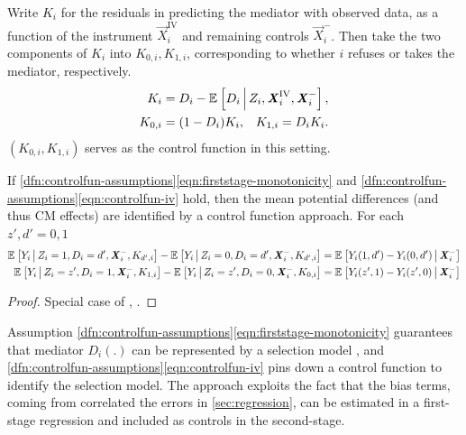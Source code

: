 Write $K_i$ for the residuals in predicting the mediator with observed data, as a function of the instrument $\vec X_i^{\text{IV}}$ and remaining controls $\vec X_i^-$.
Then take the two components of $K_i$ into $K_{0 ,i}, K_{1,i}$, corresponding to whether $i$ refuses or takes the mediator, respectively.
\begin{align*}
    K_i &= D_i - \mathbb{E}_{} \left[ D_i \, \middle\vert \, Z_i, \boldsymbol{\mathit{X}}_i^{\text{IV}}, \boldsymbol{\mathit{X}}_i^- \right], \\
    K_{0,i} &= (1 - D_i) K_i, \;\;\;
        K_{1,i} = D_i K_i.
\end{align*}
$\left( K_{0 ,i}, K_{1,i}\right)$ serves as the control function in this setting.
\begin{theorem}
    \label{thm:controlfun}
    If \ref{dfn:controlfun-assumptions}\eqref{eqn:firststage-monotonicity} and \ref{dfn:controlfun-assumptions}\eqref{eqn:controlfun-iv} hold, then the mean potential differences
    (and thus CM effects)
    are identified by a control function approach.
    For each $z', d' = 0,1$
    \begin{align*}
        \mathbb{E}_{} \left[ Y_i \, \middle\vert \, Z_i = 1, D_i = d', \boldsymbol{\mathit{X}}_i^-, K_{d',i} \right]
        - \mathbb{E}_{} \left[ Y_i \, \middle\vert \, Z_i = 0, D_i = d', \boldsymbol{\mathit{X}}_i^-, K_{d',i} \right] 
        &= \mathbb{E}_{} \left[ Y_i(1, d') - Y_i(0, d') \, \middle\vert \, \boldsymbol{\mathit{X}}_i^- \right] \\
        \mathbb{E}_{} \left[ Y_i \, \middle\vert \, Z_i = z', D_i = 1, \boldsymbol{\mathit{X}}_i^-, K_{1,i} \right]
        - \mathbb{E}_{} \left[ Y_i \, \middle\vert \, Z_i = z', D_i = 0, \boldsymbol{\mathit{X}}_i^-, K_{0,i} \right] 
        &= \mathbb{E}_{} \left[ Y_i(z', 1) - Y_i(z', 0) \, \middle\vert \, \boldsymbol{\mathit{X}}_i^- \right]
    \end{align*}
\end{theorem}
\begin{proof}
    Special case of \citet[Theorem~1]{florens2008identification}, \citet[Theorem~3]{imbens2009identification}.
\end{proof}

Assumption \ref{dfn:controlfun-assumptions}\eqref{eqn:firststage-monotonicity} guarantees that mediator $D_i(.)$ can be represented by a selection model \citep{vytlacil2002independence}, and \ref{dfn:controlfun-assumptions}\eqref{eqn:controlfun-iv} pins down a control function to identify the selection model.
The approach exploits the fact that the bias terms, coming from correlated the errors in \autoref{sec:regression}, can be estimated in a first-stage regression and included as controls in the second-stage.

